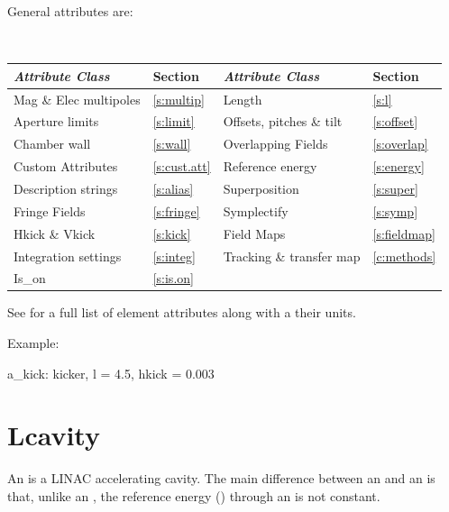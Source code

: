 General  attributes are:
\begin{center}
\tt
\begin{tabular}{llll} \toprule
  {\sl Attribute Class}      & Section           & {\sl Attribute Class}      & Section          \\ \midrule
  Mag \& Elec multipoles     & \ref{s:multip}    & Length                     & \ref{s:l}        \\
  Aperture limits            & \ref{s:limit}     & Offsets, pitches \& tilt   & \ref{s:offset}   \\
  Chamber wall               & \ref{s:wall}      & Overlapping Fields         & \ref{s:overlap}  \\
  Custom Attributes          & \ref{s:cust.att}  & Reference energy           & \ref{s:energy}   \\ 
  Description strings        & \ref{s:alias}     & Superposition              & \ref{s:super}    \\
  Fringe Fields              & \ref{s:fringe}    & Symplectify                & \ref{s:symp}     \\
  Hkick \& Vkick             & \ref{s:kick}      & Field Maps                 & \ref{s:fieldmap} \\
  Integration settings       & \ref{s:integ}     & Tracking \& transfer map   & \ref{c:methods}  \\ 
  Is_on                      & \ref{s:is.on}     &                            &                  \\
  \bottomrule
\end{tabular}
\end{center}
\toffset
See  for a full list of element attributes along with a their units.

Example:
\begin{example}
  a_kick: kicker, l = 4.5, hkick = 0.003
\end{example}

\section{Lcavity}
\label{s:lcav}

An  is a LINAC accelerating cavity.  The main difference between an
 and an  is that, unlike an , the reference energy
() through an  is not constant.

